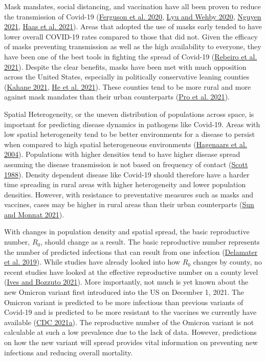 \documentclass[
  12pt,
]{article}
\begin{document}
Mask mandates, social distancing, and vaccination have all been proven to reduce the transmission of Covid-19 (\protect\hyperlink{ref-ferguson_report_2020}{Ferguson et al. 2020}, \protect\hyperlink{ref-lyu_community_2020}{Lyu and Wehby 2020}, \protect\hyperlink{ref-nguyen_mask_2021}{Nguyen 2021}, \protect\hyperlink{ref-haas_infections_2021}{Haas et al. 2021}). Areas that adopted the use of masks early tended to have lower overall COVID-19 rates compared to those that did not. Given the efficacy of masks preventing transmission as well as the high availability to everyone, they have been one of the best tools in fighting the spread of Covid-19 (\protect\hyperlink{ref-rebeiro_impact_2021}{Rebeiro et al. 2021}). Despite the clear benefits, masks have been met with much opposition across the United States, especially in politically conservative leaning counties (\protect\hyperlink{ref-kahane_politicizing_2021}{Kahane 2021}, \protect\hyperlink{ref-he_why_2021}{He et al. 2021}). These counties tend to be more rural and more against mask mandates than their urban counterparts (\protect\hyperlink{ref-pro_us_2021}{Pro et al. 2021}).

Spatial Heterogeneity, or the uneven distribution of populations across space, is important for predicting disease dynamics in pathogens like Covid-19. Areas with low spatial heterogeneity tend to be better environments for a disease to persist when compared to high spatial heterogeneous environments (\protect\hyperlink{ref-hagenaars_spatial_2004}{Hagenaars et al. 2004}). Populations with higher densities tend to have higher disease spread assuming the disease transmission is not based on frequency of contact (\protect\hyperlink{ref-scott_impact_1988}{Scott 1988}). Density dependent disease like Covid-19 should therefore have a harder time spreading in rural areas with higher heterogeneity and lower population densities. However, with resistance to preventative measures such as masks and vaccines, cases may be higher in rural areas than their urban counterparts (\protect\hyperlink{ref-sun_rural-urban_2021}{Sun and Monnat 2021}).

With changes in population density and spatial spread, the basic reproductive number, \(R_0\), should change as a result. The basic reproductive number represents the number of predicted infections that can result from one infection (\protect\hyperlink{ref-delamater_complexity_2019}{Delamater et al. 2019}). While studies have already looked into how \(R_0\) changes by county, no recent studies have looked at the effective reproductive number on a county level (\protect\hyperlink{ref-ives_estimating_2021}{Ives and Bozzuto 2021}). More importantly, not much is yet known about the new Omicron variant first introduced into the US on December 1, 2021. The Omicron variant is predicted to be more infectious than previous variants of Covid-19 and is predicted to be more resistant to the vaccines we currently have available (\protect\hyperlink{ref-cdc_omicron_2021}{CDC 2021a}). The reproductive number of the Omicron variant is not calculable at such a low prevalence due to the lack of data. However, predictions on how the new variant will spread provides vital information on preventing new infections and reducing overall mortality.
\end{document}
